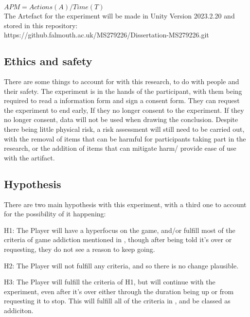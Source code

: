 \documentclass[conference]{IEEEtran}
\begin{document}
\begin{math}APM = Actions(A)/Time(T)\end{math}\\

The Artefact for the experiment will be made in Unity Version 2023.2.20 \cite{Unity23} and stored in this repository:\\

\hypertarget{https://github.falmouth.ac.uk/MS279226/Dissertation-MS279226.git}{https://github.falmouth.ac.uk/MS279226/Dissertation-MS279226.git}\\

\subsection{Ethics and safety}
There are some things to account for with this research, to do with people and their safety. The experiment is in the hands of the participant, with them being required to read a information form and sign a consent form. They can request the experiment to end early, If they no longer consent to the experiment.  If they no longer consent, data will not be used when drawing the conclusion. Despite there being little physical risk, a risk assessment will still need to be carried out, with the removal of items that can be harmful for participants taking part in the research, or the addition of items that can mitigate harm/ provide ease of use with the artifact.\\

\subsection {Hypothesis}
There are two main hypothesis with this experiment, with a third one to account for the possibility of it happening:

H1: The Player will have a hyperfocus on the game, and/or fulfill most of the criteria of game addiction mentioned in \cite{NHSHamp24}, though after being told it's over or requesting, they do not see a reason to keep going.

H2: The Player will not fulfill any criteria, and so there is no change plausible.

H3: The Player will fulfill the criteria of H1, but will continue with the experiment, even after it's over either through the duration being up or from requesting it to stop. This will fulfill all of the criteria in \cite{NHSHamp24}, and be classed as addiciton. \\
\end{document}
